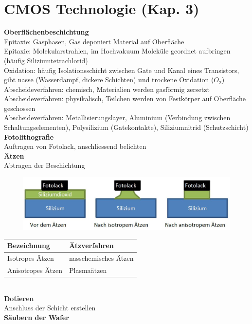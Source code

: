
\section{CMOS Technologie (Kap. 3)}

\begin{minipage}[t]{0.5\textwidth}
	\textbf{Oberflächenbeschichtung}\\
	Epitaxie: Gasphasen, Gas deponiert Material auf Oberfläche\\ 
	Epitaxie: Molekularstrahlen, im Hochvakuum Moleküle geordnet aufbringen (häufig Siliziumtetrachlorid) \\
	Oxidation: häufig Isolationsschicht zwischen Gate und Kanal eines Transistors, gibt nasse (Wasserdampf, dickere Schichten) und trockene Oxidation ($O_2$) \\
	Abscheideverfahren: chemisch, Materialien werden gasförmig zersetzt \\
	Abscheideverfahren: physikalisch, Teilchen werden von Festkörper auf Oberfläche geschossen\\
	Abscheideverfahren: Metallisierungslayer, Aluminium (Verbindung zwischen Schaltungselementen), Polysilizium (Gatekontakte), Siliziumnitrid (Schutzschicht) \\
	\textbf{Fotolithografie}\\
	Auftragen von Fotolack, anschliessend belichten\\ 
	\textbf{Ätzen}\\
	Abtragen der Beschichtung
	\begin{figure}[H]
		\includegraphics[width=0.8\linewidth]{chapters/Technologie/images/Aetzen}
	\end{figure}
	\begin{tabular}{|l|l|}
		\hline
		\textbf{Bezeichnung}&\textbf{Ätzverfahren}\\ \hline
		Isotropes Ätzen&nasschemisches Ätzen\\ \hline
		Anisotropes Ätzen&Plasmaätzen\\ \hline
	\end{tabular}\\ [2ex]
	\textbf{Dotieren}\\
	Anschluss der Schicht erstellen\\ [2ex]
	\textbf{Säubern der Wafer}\\
\end{minipage}
